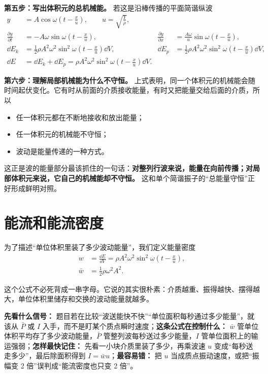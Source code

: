 \documentclass[lang=cn,11pt]{elegantbook}
\newcommand{\bridge}[1]{\begin{note}#1\end{note}}
\begin{document}
\textbf{第五步：写出体积元的总机械能。} 若这是沿棒传播的平面简谐纵波
\begin{align*}
y&=A\cos\omega\left(t-\frac{x}{u}\right),\qquad u=\sqrt{\frac{Y}{\rho}},\\
\frac{\partial y}{\partial t}&=-A\omega\sin\omega\left(t-\frac{x}{u}\right),&
\frac{\partial y}{\partial x}&=\frac{A\omega}{u}\sin\omega\left(t-\frac{x}{u}\right),\\
\dd E_k&=\frac12 \rho A^2\omega^2\sin^2\omega\left(t-\frac{x}{u}\right)\dd V,&
\dd E_p&=\frac12 \rho A^2\omega^2\sin^2\omega\left(t-\frac{x}{u}\right)\dd V,\\
\dd E&=\dd E_k+\dd E_p=\rho A^2\omega^2\sin^2\omega\left(t-\frac{x}{u}\right)\dd V.
\end{align*}

\textbf{第六步：理解局部机械能为什么不守恒。} 上式表明，同一个体积元的机械能会随时间起伏变化。它有时从前面的介质接收能量，有时又把能量交给后面的介质，所以
\begin{itemize}
  \item 任一体积元都在不断地接收和放出能量；
  \item 任一体积元的机械能不守恒；
  \item 波动是能量传递的一种方式。
\end{itemize}

\begin{note}
这正是波的能量部分最该抓住的一句话：\textbf{对整列行波来说，能量在向前传播；对局部体积元来说，它自己的机械能却不守恒。} 这和单个简谐振子的“总能量守恒”正好形成鲜明对照。
\end{note}

\section{能流和能流密度}

为了描述“单位体积里装了多少波动能量”，我们定义能量密度
\[
\begin{aligned}
w&=\frac{\dd E}{\dd V}
=\rho A^2\omega^2\sin^2\omega\left(t-\frac{x}{u}\right),\\
\bar w&=\frac12 \rho\omega^2A^2.
\end{aligned}
\]

\bridge{这个公式不必死背成一串字母。它说的其实很朴素：介质越重、振得越快、摆得越大，单位体积里储存和交换的波动能量就越多。}

\begin{note}
\textbf{先看什么信号：} 题目若在比较“波送能快不快”“单位面积每秒通过多少能量”，就该从 \(\bar P\) 或 \(I\) 入手，而不是盯某个质点瞬时速度；\textbf{这条公式在控制什么：} \(\bar w\) 管单位体积平均存了多少波动能量，\(\bar P\) 管整列波每秒送过多少能量，\(I\) 管单位面积上的输运强弱；\textbf{怎样最快记住：} 先看一小块介质里装了多少，再乘波速 \(u\) 变成“每秒送走多少”，最后除面积得到 \(I=\bar wu\)；\textbf{最容易错：} 把 \(u\) 当成质点振动速度，或把“振幅变 2 倍”误判成“能流密度也只变 2 倍”。
\end{note}
\end{document}
